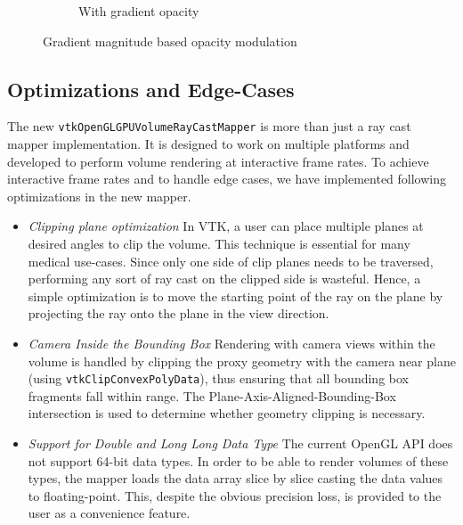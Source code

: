 \begin{figure}[htb]
\begin{subfigure}[b]{0.5\columnwidth}
    \caption{With gradient opacity}
    \label{fig:Ng2}
  \end{subfigure}
  \caption{Gradient magnitude based opacity modulation}
  \label{fig:gradient}
\end{figure}

\subsection{Optimizations and Edge-Cases} The new
\texttt{vtkOpenGLGPUVolumeRayCastMapper} is more than just a ray cast mapper
implementation. It is designed to work on multiple platforms and developed to
perform volume rendering at interactive frame rates. To achieve interactive
frame rates and to handle edge cases, we have implemented following
optimizations in the new mapper.

\begin{itemize}
  \item \emph{Clipping plane optimization} In VTK, a user can place multiple
    planes at desired angles to clip the volume. This technique is essential for
    many medical use-cases. Since only one side of clip planes needs to be
    traversed, performing any sort of ray cast on the clipped side is wasteful.
    Hence, a simple optimization is to move the starting point of the ray on the
    plane by projecting the ray onto the plane in the view direction.
  \item \emph{Camera Inside the Bounding Box} Rendering with camera views within
    the volume is handled by clipping the proxy geometry with the camera near
    plane (using \texttt{vtkClipConvexPolyData}), thus ensuring that all
    bounding box fragments fall within range.  The Plane-Axis-Aligned-Bounding-Box
    intersection is used to determine whether geometry clipping is necessary.
  \item \emph{Support for Double and Long Long Data Type} The current OpenGL API
    does not support 64-bit data types. In order to be able to render volumes of
    these types, the mapper loads the data array slice by slice casting the data
    values to floating-point. This, despite the obvious precision loss, is
    provided to the user as a convenience feature.
\end{itemize}

